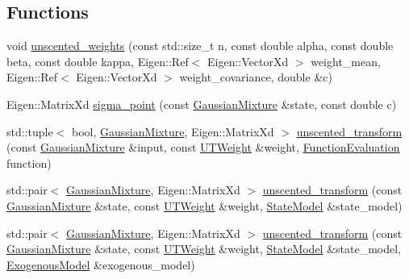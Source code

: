 \subsection*{Functions}
\begin{DoxyCompactItemize}
\item 
void \mbox{\hyperlink{namespacebfl_1_1sigma__point_a2cdca209c158edd6440c2f077b345799}{unscented\+\_\+weights}} (const std\+::size\+\_\+t n, const double alpha, const double beta, const double kappa, Eigen\+::\+Ref$<$ Eigen\+::\+Vector\+Xd $>$ weight\+\_\+mean, Eigen\+::\+Ref$<$ Eigen\+::\+Vector\+Xd $>$ weight\+\_\+covariance, double \&c)
\item 
Eigen\+::\+Matrix\+Xd \mbox{\hyperlink{namespacebfl_1_1sigma__point_ab919aca5fccc30ee2acd5cd966cd9dc9}{sigma\+\_\+point}} (const \mbox{\hyperlink{classbfl_1_1GaussianMixture}{Gaussian\+Mixture}} \&state, const double c)
\item 
std\+::tuple$<$ bool, \mbox{\hyperlink{classbfl_1_1GaussianMixture}{Gaussian\+Mixture}}, Eigen\+::\+Matrix\+Xd $>$ \mbox{\hyperlink{namespacebfl_1_1sigma__point_afe170453152d4f96db4dad71bd9be9a3}{unscented\+\_\+transform}} (const \mbox{\hyperlink{classbfl_1_1GaussianMixture}{Gaussian\+Mixture}} \&input, const \mbox{\hyperlink{structbfl_1_1sigma__point_1_1UTWeight}{U\+T\+Weight}} \&weight, \mbox{\hyperlink{namespacebfl_1_1sigma__point_a6b412638c2556e4c1f84ba10965f785e}{Function\+Evaluation}} function)
\item 
std\+::pair$<$ \mbox{\hyperlink{classbfl_1_1GaussianMixture}{Gaussian\+Mixture}}, Eigen\+::\+Matrix\+Xd $>$ \mbox{\hyperlink{namespacebfl_1_1sigma__point_a49b40777ee901dfbe3752e8f165fb439}{unscented\+\_\+transform}} (const \mbox{\hyperlink{classbfl_1_1GaussianMixture}{Gaussian\+Mixture}} \&state, const \mbox{\hyperlink{structbfl_1_1sigma__point_1_1UTWeight}{U\+T\+Weight}} \&weight, \mbox{\hyperlink{classbfl_1_1StateModel}{State\+Model}} \&state\+\_\+model)
\item 
std\+::pair$<$ \mbox{\hyperlink{classbfl_1_1GaussianMixture}{Gaussian\+Mixture}}, Eigen\+::\+Matrix\+Xd $>$ \mbox{\hyperlink{namespacebfl_1_1sigma__point_a9b4d661460ac0ad28493ae144a6ccee4}{unscented\+\_\+transform}} (const \mbox{\hyperlink{classbfl_1_1GaussianMixture}{Gaussian\+Mixture}} \&state, const \mbox{\hyperlink{structbfl_1_1sigma__point_1_1UTWeight}{U\+T\+Weight}} \&weight, \mbox{\hyperlink{classbfl_1_1StateModel}{State\+Model}} \&state\+\_\+model, \mbox{\hyperlink{classbfl_1_1ExogenousModel}{Exogenous\+Model}} \&exogenous\+\_\+model)
\item 

\end{DoxyCompactItemize}
